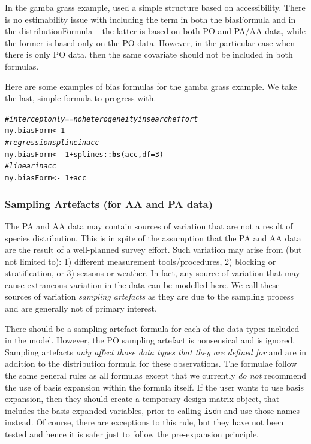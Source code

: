\documentclass[article,shortnames,nojss]{jss}\usepackage[]{graphicx}\usepackage[]{xcolor}
\makeatletter
\newcommand{\hlnum}[1]{\textcolor[rgb]{0.686,0.059,0.569}{#1}}%
\newcommand{\hlcom}[1]{\textcolor[rgb]{0.678,0.584,0.686}{\textit{#1}}}%
\newcommand{\hlopt}[1]{\textcolor[rgb]{0,0,0}{#1}}%
\newcommand{\hlstd}[1]{\textcolor[rgb]{0.345,0.345,0.345}{#1}}%
\newcommand{\hlkwb}[1]{\textcolor[rgb]{0.69,0.353,0.396}{#1}}%
\newcommand{\hlkwc}[1]{\textcolor[rgb]{0.333,0.667,0.333}{#1}}%
\newcommand{\hlkwd}[1]{\textcolor[rgb]{0.737,0.353,0.396}{\textbf{#1}}}%
\newenvironment{kframe}{%
 \def\at@end@of@kframe{}%
 \ifinner\ifhmode%
  \def\at@end@of@kframe{\end{minipage}}%
  \begin{minipage}{\columnwidth}%
 \fi\fi%
 \def\FrameCommand##1{\hskip\@totalleftmargin \hskip-\fboxsep
 \colorbox{shadecolor}{##1}\hskip-\fboxsep
     \hskip-\linewidth \hskip-\@totalleftmargin \hskip\columnwidth}%
 \MakeFramed {\advance\hsize-\width
   \@totalleftmargin\z@ \linewidth\hsize
   \@setminipage}}%
 {\par\unskip\endMakeFramed%
 \at@end@of@kframe}
\newenvironment{knitrout}{}{} %
\makeatother
\begin{document}
In the gamba grass example, \citet{fos24} used a simple structure based on accessibility. There is no estimability issue with including the term in both the biasFormula and in the distributionFormula -- the latter is based on both PO and PA/AA data, while the former is based only on the PO data. However, in the particular case when there is only PO data, then the same covariate should not be included in both formulas.

Here are some examples of bias formulas for the gamba grass example. We take the last, simple formula to progress with.
\begin{knitrout}
\color{fgcolor}\begin{kframe}
\begin{alltt}
\hlcom{#intercept only == no heterogeneity in search effort}
\hlstd{my.biasForm} \hlkwb{<-} \hlnum{1}
\hlcom{#regression spline in acc}
\hlstd{my.biasForm} \hlkwb{<-} \hlopt{~}\hlnum{1}\hlopt{+}\hlstd{splines}\hlopt{::}\hlkwd{bs}\hlstd{( acc,} \hlkwc{df}\hlstd{=}\hlnum{3}\hlstd{)}
\hlcom{#linear in acc}
\hlstd{my.biasForm} \hlkwb{<-} \hlopt{~}\hlnum{1}\hlopt{+}\hlstd{acc}
\end{alltt}
\end{kframe}
\end{knitrout}

\subsubsection*{Sampling Artefacts (for AA and PA data)}

The PA and AA data may contain sources of variation that are not a result of species distribution. This is in spite of the assumption that the PA and AA data are the result of a well-planned survey effort. Such variation may arise from (but not limited to): 1) different measurement tools/procedures, 2) blocking or stratification, or 3) seasons or weather. In fact, any source of variation that may cause extraneous variation in the data can be modelled here. We call these sources of variation \textit{sampling artefacts} as they are due to the sampling process and are generally not of primary interest.

There should be a sampling artefact formula for each of the data types included in the model. However, the PO sampling artefact is nonsensical and is ignored. Sampling artefacts \textit{only affect those data types that they are defined for} and are in addition to the distribution formula for these observations. The formulae follow the same general rules as all formulas except that we currently \textit{do not} recommend the use of basis expansion within the formula itself. If the user wants to use basis expansion, then they should create a temporary design matrix object, that includes the basis expanded variables, prior to calling \texttt{isdm} and use those names instead. Of course, there are exceptions to this rule, but they have not been tested and hence it is safer just to follow the pre-expansion principle.
\end{document}
